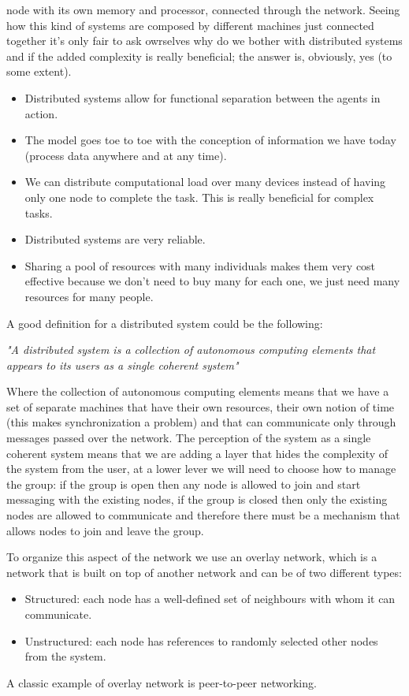 node with its own memory and processor, connected through the network. Seeing how this kind of systems are composed by different machines just connected together it's only fair to ask owrselves why do we bother with distributed systems and if the added complexity is really beneficial; the answer is, obviously, yes (to some extent).
\begin{itemize}
	\item Distributed systems allow for functional separation between the agents in action.
	\item The model goes toe to toe with the conception of information we have today (process data anywhere and at any time).
	\item We can distribute computational load over many devices instead of having only one node to complete the task. This is really beneficial for complex tasks.
	\item Distributed systems are very reliable.
	\item Sharing a pool of resources with many individuals makes them very cost effective because we don't need to buy many for each one, we just need many resources for many people.
\end{itemize}
A good definition for a distributed system could be the following:
\begin{center}
	\textit{"A distributed system is a collection of autonomous computing elements that appears to its users as a single coherent system"}
\end{center}
Where the collection of autonomous computing elements means that we have a set of separate machines that have their own resources, their own notion of time (this makes synchronization a problem) and that can communicate only through messages passed over the network. The perception of the system as a single coherent system means that we are adding a layer that hides the complexity of the system from the user, at a lower lever we will need to choose how to manage the group: if the group is open then any node is allowed to join and start messaging with the existing nodes, if the group is closed then only the existing nodes are allowed to communicate and therefore there must be a mechanism that allows nodes to join and leave the group.

To organize this aspect of the network we use an overlay network, which is a network that is built on top of another network and can be of two different types:
\begin{itemize}
	\item Structured: each node has a well-defined set of neighbours with whom it can communicate.
	\item Unstructured: each node has references to randomly selected other nodes from the system.
\end{itemize}
A classic example of overlay network is peer-to-peer networking.

